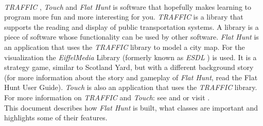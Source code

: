 \paragraph{}
\emph{TRAFFIC} \cite{dgsa05}, \emph{Touch} \cite{dgrk05} and \emph{Flat Hunt} is software that hopefully makes learning to program more fun and more interesting for you. \emph{TRAFFIC} is a library that supports the reading and display of public transportation systems. A library is a piece of software whose functionality can be used by other software. \emph{Flat Hunt} is an application that uses the \emph{TRAFFIC} library to model a city map. For the visualization the \emph{EiffelMedia} Library (formerly known as \emph{ESDL} \cite{dgtgb03}\cite{dgbb04}) is used. It is a strategy game, similar to Scotland Yard, but with a different background story (for more information about the story and gameplay of \emph{Flat Hunt}, read the Flat Hunt User Guide). \emph{Touch} is also an application that uses the \emph{TRAFFIC} library. For more information on \emph{TRAFFIC} and \emph{Touch}: see \cite{dgsa05} and \cite{dgrk05} or visit .\\

  This document describes how \emph{Flat Hunt} is built, what classes are important and highlights some of their features.

\pagebreak
